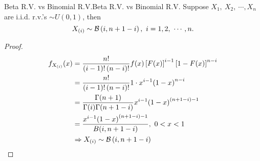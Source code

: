 \documentclass{elegantbook}
\begin{document}
\begin{corollary}{Beta R.V. vs Binomial R.V.}{Beta R.V. vs Binomial R.V.}
Suppose \(X_{1},\ X_{2},\ \cdots,X_{n}\) are i.i.d. r.v.'s \(\sim U(0,1)\), then
\[X_{(i)}\sim\mathcal{B}\left( i,n + 1 - i \right),\ i = 1,2,\ \cdots,n.\]
\end{corollary}

\begin{proof}
\[\begin{aligned}
f_{X_{\left( i \right)}}(x) &= \frac{n!}{\left( i - 1 \right)!\left( n - i \right)!}f(x)\left\lbrack F(x) \right\rbrack^{i - 1}\left\lbrack 1 - F(x) \right\rbrack^{n - i}\\
&= \frac{n!}{\left( i - 1 \right)!\left( n - i \right)!}1 \cdot x^{i - 1}{(1 - x)}^{n - i}\\
&= \frac{\Gamma(n + 1)}{\Gamma(i)\Gamma(n + 1 - i)}x^{i - 1}{(1 - x)}^{(n + 1 - i) - 1}\\
&= \frac{x^{i - 1}{(1 - x)}^{(n + 1 - i) - 1}}{B(i,n + 1 - i)},\ 0 < x < 1\\
&\Rightarrow X_{(i)}\sim\mathcal{B}\left( i,n + 1 - i \right)
\end{aligned}\]
\end{proof}
\end{document}
